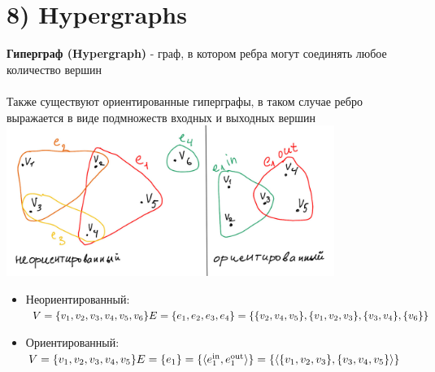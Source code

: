 \documentclass[../TM3-UltraDoc.tex]{subfiles}
\begin{document}
	\section*{8) Hypergraphs}
	\textbf{Гиперграф (Hypergraph)} - граф, в котором ребра могут соединять любое количество вершин\\
	\\
	Также существуют ориентированные гиперграфы, в таком случае ребро выражается в виде подмножеств входных и выходных вершин\\
	\includegraphics[width = 0.8\textwidth]{8.1}\\
	\begin{itemize}
		\item Неориентированный:\\
		\(
		V = \{v_1, v_2, v_3, v_4, v_5, v_6\}\\
		E = \{e_1, e_2, e_3, e_4\} = \{\{v_2, v_4, v_5\}, \{v_1, v_2, v_3\}, \{v_3, v_4\}, \{v_6\}\}
		\)
		\item Ориентированный:\\
		\(
		V = \{v_1, v_2, v_3, v_4, v_5\}\\
		E = \{e_1\} = \{\langle e^{\text{in}}_1, e^{\text{out}}_1 \rangle\} = \{\langle \{v_1, v_2, v_3\}, \{v_3, v_4, v_5\} \rangle\}
		\)
		
	\end{itemize}
	
\end{document}
